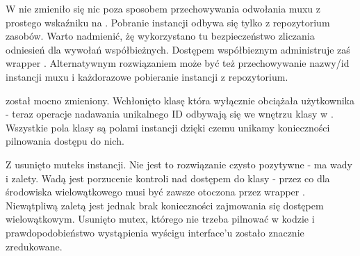 W  nie zmieniło się nic poza sposobem przechowywania odwołania muxu z prostego wskaźniku na . Pobranie instancji  odbywa się tylko z repozytorium zasobów. Warto nadmienić, żę wykorzystano tu bezpieczeństwo zliczania odniesień  dla wywołań współbieżnych. Dostępem współbieznym administruje zaś wrapper . Alternatywnym rozwiązaniem może być też przechowywanie nazwy/id instancji muxu i każdorazowe pobieranie instancji z repozytorium.

 został mocno zmieniony. Wchłonięto klasę  która wyłącznie obciążała użytkownika - teraz operacje nadawania unikalnego ID odbywają się we wnętrzu klasy w . Wszystkie pola klasy są polami instancji dzięki czemu unikamy konieczności pilnowania dostępu do nich.

Z  usunięto muteks instancji. Nie jest to rozwiązanie czysto pozytywne - ma wady i zalety. Wadą jest porzucenie kontroli nad dostępem do klasy - przez co dla środowiska wielowątkowego musi być zawsze otoczona przez wrapper . Niewątpliwą zaletą jest jednak brak konieczności zajmowania się dostępem wielowątkowym. Usunięto mutex, którego nie trzeba pilnować w kodzie i prawdopodobieństwo wystąpienia wyścigu interface'u zostało znacznie zredukowane.
